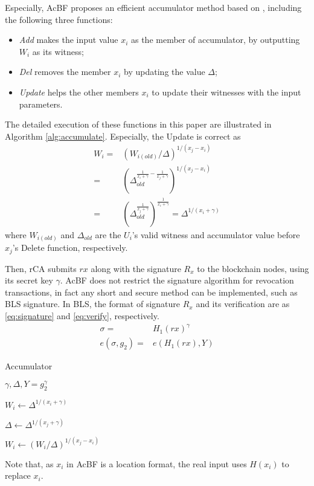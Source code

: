 \documentclass[conference]{IEEEtran}
\begin{document}
Especially, AcBF proposes an efficient accumulator method based on \cite{accumulator}, including the following three functions:
\begin{itemize}
	\item \textit{Add} makes the input value $x_i$ as the member of accumulator, by outputting $W_i$ as its witness;
	\item \textit{Del} removes the member $x_i$ by updating the value $\Delta$;
	\item \textit{Update} helps the other members $x_i$ to update their witnesses with the input parameters.
\end{itemize}
The detailed execution of these functions in this paper are illustrated in Algorithm \ref{alg:accumulate}. Especially, the Update is correct as 
\begin{align}
	W_i =& (W_{i(old)}/\Delta)^{1/(x_j - x_i)}  \nonumber\\
	= & (\Delta_{old}^{\frac{1}{x_i+\gamma} - \frac{1}{x_j+\gamma}})^{1/(x_j-x_i)} \\
	= & (\Delta_{old}^{\frac{1}{x_j+\gamma}})^{\frac{1}{x_i+\gamma}} = \Delta^{1/(x_i+\gamma)} \nonumber
\end{align}
where $W_{i(old)}$ and $\Delta_{old}$ are the $U_i$'s valid witness and accumulator value before $x_j$'s Delete function, respectively.

Then, rCA submits $rx$ along with the signature $R_x$ to the blockchain nodes, using its secret key $\gamma$. AcBF does not restrict the signature algorithm for revocation transactions, in fact any short and secure method can be implemented, such as BLS \cite{boneh2004short} signature. In BLS, the format of signature $R_x$ and its verification are as \eqref{eq:signature} and \eqref{eq:verify}, respectively.
\begin{align}
\sigma = & H_1(rx)^\gamma \label{eq:signature}\\
e(\sigma, g_2)=& e(H_1(rx), Y) \label{eq:verify}
\end{align}


\begin{algorithm}[t]
	\renewcommand{\algorithmicensure}{\textbf{Output:}}
	\caption{Accumulator}\label{alg:accumulate}
	\begin{algorithmic}[1]
		\Require $\gamma, \Delta, Y= g_2^\gamma$ %
		
		\Return $W_i \gets \Delta ^{1/(x_i + \gamma)}$
		\EndFunction
		
		
		\Return $\Delta \gets \Delta ^{1/(x_j + \gamma)}$
		\EndFunction
		 \label{fuction:update}
		
		\Return $W_i \gets (W_i/\Delta)^{1/(x_j - x_i)}$
		\EndFunction
	\end{algorithmic}
Note that, as $x_i$ in AcBF is a location format, the real input uses $H(x_i)$ to replace $x_i$. 
\end{algorithm}
\end{document}
